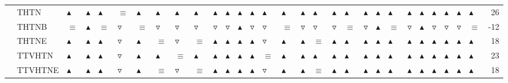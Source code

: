 \begin{table}
\begin{tabular}{lllllllllllllllllllllllllllllr}
       & THTN &  $\blacktriangle$ &  $\blacktriangle$ &  $\blacktriangle$ &         $\equiv$ &  $\blacktriangle$ &  $\blacktriangle$ &  $\blacktriangle$ &  $\blacktriangle$ &  $\blacktriangle$ &  $\blacktriangle$ &  $\blacktriangle$ &  $\blacktriangle$ &  $\blacktriangle$ &  $\blacktriangle$ &  $\blacktriangle$ &  $\blacktriangle$ &  $\blacktriangle$ &  $\blacktriangle$ &  $\blacktriangle$ &  $\blacktriangle$ &  $\blacktriangle$ &  $\blacktriangle$ &  $\blacktriangle$ &  $\blacktriangle$ &  $\blacktriangle$ &  $\blacktriangle$ &  $\blacktriangle$ &       26 \\
       & THTNB &          $\equiv$ &  $\blacktriangle$ &          $\equiv$ &  $\triangledown$ &          $\equiv$ &   $\triangledown$ &   $\triangledown$ &   $\triangledown$ &   $\triangledown$ &   $\triangledown$ &  $\blacktriangle$ &   $\triangledown$ &   $\triangledown$ &          $\equiv$ &   $\triangledown$ &   $\triangledown$ &   $\triangledown$ &          $\equiv$ &   $\triangledown$ &  $\blacktriangle$ &          $\equiv$ &   $\triangledown$ &  $\blacktriangle$ &   $\triangledown$ &   $\triangledown$ &   $\triangledown$ &          $\equiv$ &      -12 \\
       & THTNE &  $\blacktriangle$ &  $\blacktriangle$ &  $\blacktriangle$ &  $\triangledown$ &  $\blacktriangle$ &          $\equiv$ &   $\triangledown$ &          $\equiv$ &  $\blacktriangle$ &  $\blacktriangle$ &  $\blacktriangle$ &  $\blacktriangle$ &   $\triangledown$ &  $\blacktriangle$ &  $\blacktriangle$ &          $\equiv$ &  $\blacktriangle$ &  $\blacktriangle$ &  $\blacktriangle$ &  $\blacktriangle$ &  $\blacktriangle$ &  $\blacktriangle$ &  $\blacktriangle$ &  $\blacktriangle$ &  $\blacktriangle$ &  $\blacktriangle$ &  $\blacktriangle$ &       18 \\
       & TTVHTN &  $\blacktriangle$ &  $\blacktriangle$ &  $\blacktriangle$ &  $\triangledown$ &  $\blacktriangle$ &  $\blacktriangle$ &          $\equiv$ &  $\blacktriangle$ &  $\blacktriangle$ &  $\blacktriangle$ &  $\blacktriangle$ &  $\blacktriangle$ &          $\equiv$ &  $\blacktriangle$ &  $\blacktriangle$ &  $\blacktriangle$ &  $\blacktriangle$ &  $\blacktriangle$ &  $\blacktriangle$ &  $\blacktriangle$ &  $\blacktriangle$ &  $\blacktriangle$ &  $\blacktriangle$ &  $\blacktriangle$ &  $\blacktriangle$ &  $\blacktriangle$ &  $\blacktriangle$ &       23 \\
       & TTVHTNE &  $\blacktriangle$ &  $\blacktriangle$ &  $\blacktriangle$ &  $\triangledown$ &  $\blacktriangle$ &          $\equiv$ &   $\triangledown$ &          $\equiv$ &  $\blacktriangle$ &  $\blacktriangle$ &  $\blacktriangle$ &  $\blacktriangle$ &   $\triangledown$ &  $\blacktriangle$ &  $\blacktriangle$ &          $\equiv$ &  $\blacktriangle$ &  $\blacktriangle$ &  $\blacktriangle$ &  $\blacktriangle$ &  $\blacktriangle$ &  $\blacktriangle$ &  $\blacktriangle$ &  $\blacktriangle$ &  $\blacktriangle$ &  $\blacktriangle$ &  $\blacktriangle$ &       18 \\

\end{tabular}
\end{table}
